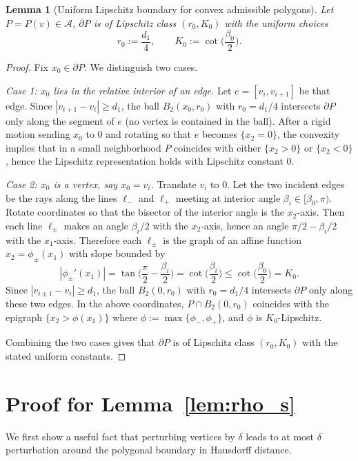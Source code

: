 \documentclass{article}
\newtheorem{lemma}[theorem]{Lemma}
\begin{document}
\begin{lemma}[Uniform Lipschitz boundary for convex admissible polygons]\label{lem:A4_from_A23_conv}
Let $P=P(v) \in \mathcal{A}$, $\partial P$ is of Lipschitz class $(r_0,K_0)$ with the \emph{uniform} choices
\[
r_0:=\frac{d_1}{4},
\qquad
K_0:=\cot\!\Big(\frac{\beta_0}{2}\Big).
\]
\end{lemma}

\begin{proof}
Fix $x_0\in\partial P$. We distinguish two cases.

\emph{Case 1: $x_0$ lies in the relative interior of an edge.}
Let $e=[v_i,v_{i+1}]$ be that edge. Since $|v_{i+1}-v_i|\ge d_1$, the ball
$B_2(x_0,r_0)$ with $r_0=d_1/4$ intersects $\partial P$ only along the segment of $e$
(no vertex is contained in the ball).
After a rigid motion sending $x_0$ to $0$ and rotating so that $e$ becomes $\{x_2=0\}$,
the convexity implies that in a small neighborhood $P$ coincides with either $\{x_2>0\}$
or $\{x_2<0\}$, hence the Lipschitz representation holds with Lipschitz constant $0$.

\emph{Case 2: $x_0$ is a vertex, say $x_0=v_i$.}
Translate $v_i$ to $0$. Let the two incident edges be the rays along the lines
$\ell_-$ and $\ell_+$ meeting at interior angle $\beta_i\in[\beta_0,\pi)$.
Rotate coordinates so that the bisector of the interior angle is the $x_2$-axis.
Then each line $\ell_\pm$ makes an angle $\beta_i/2$ with the $x_2$-axis, hence an angle
$\pi/2-\beta_i/2$ with the $x_1$-axis. Therefore each $\ell_\pm$ is the graph of an affine function
$x_2=\phi_\pm(x_1)$ with slope bounded by
\[
|\phi_\pm'(x_1)|=\tan\!\Big(\frac{\pi}{2}-\frac{\beta_i}{2}\Big)=\cot\!\Big(\frac{\beta_i}{2}\Big)
\le \cot\!\Big(\frac{\beta_0}{2}\Big)=K_0.
\]
Since $|v_{i\pm 1}-v_i|\ge d_1$, the ball $B_2(0,r_0)$ with $r_0=d_1/4$ intersects $\partial P$
only along these two edges. In the above coordinates, $P\cap B_2(0,r_0)$ coincides with the epigraph
$\{x_2>\phi(x_1)\}$ where $\phi:=\max\{\phi_-,\phi_+\}$, and $\phi$ is $K_0$-Lipschitz.

Combining the two cases gives that $\partial P$ is of Lipschitz class $(r_0,K_0)$ with the stated
uniform constants.
\end{proof}

\section{Proof for Lemma~\ref{lem:rho_s}}
\label{sec:proof_rho_s}
We first show a useful fact that perturbing vertices by $\delta$ leads to at most $\delta$ perturbation around the polygonal boundary in Hausdorff distance.
\end{document}

